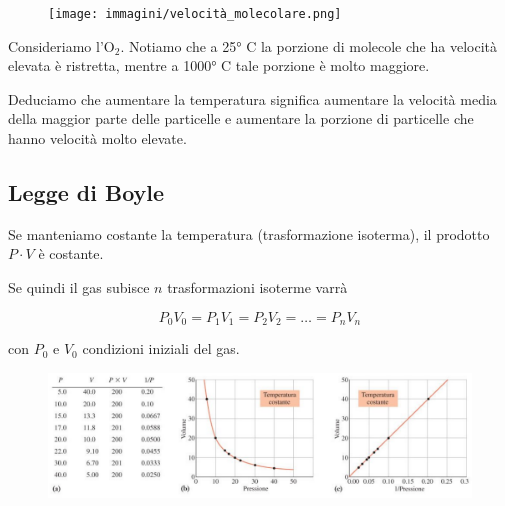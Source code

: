 
\begin{figure}[H]
    \centering
    \texttt{[image: immagini/velocità\_molecolare.png]}
\end{figure}

Consideriamo l'O$_2$. Notiamo che a 25° C la porzione di molecole che ha velocità elevata è ristretta, mentre a 1000° C tale porzione è molto maggiore.

Deduciamo che aumentare la temperatura significa aumentare la velocità media della maggior parte delle particelle e aumentare la porzione di particelle che hanno velocità molto elevate.

\subsection{Legge di Boyle}
Se manteniamo costante la temperatura (trasformazione isoterma), il prodotto $P \cdot V$ è costante.

Se quindi il gas subisce $n$ trasformazioni isoterme varrà

$$P_0V_0=P_1V_1=P_2V_2=\ldots=P_nV_n$$

con $P_0$ e $V_0$ condizioni iniziali del gas.

\begin{figure}[htp]
    \centering
    \includegraphics[width=15cm]{immagini/Legge_di_Boyle.png}
\end{figure}

